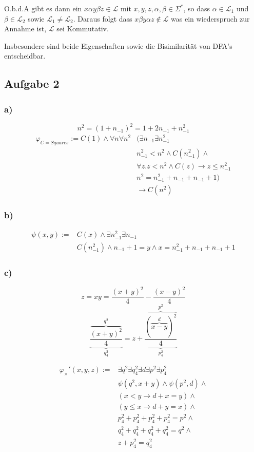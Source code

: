 \documentclass[12pt]{article}
\begin{document}
O.b.d.A gibt es dann ein $x\alpha y\beta z\in \mathcal{L}$ mit $x,y,z,\alpha, \beta\in\Sigma^*$, so dass $\alpha\in \mathcal{L}_1$ und $\beta\in \mathcal{L}_2$ sowie $\mathcal{L}_1\neq \mathcal{L}_2$. Daraus folgt dass $x\beta y\alpha z\notin \mathcal{L}$ was
ein wiederspruch zur Annahme ist, $\mathcal{L}$ sei Kommutativ.

Insbesondere sind beide Eigenschaften sowie die Bisimilarität von DFA's entscheidbar.

\subsection*{Aufgabe 2}
\subsubsection*{a)}
\[ n^2= (1+n_{-1})^2 = 1 + 2 n_{-1} +n_{-1}^2 \]
\begin{align}
  \varphi_{C=Squares} := C(1) \land \forall n\forall n^2 &(\exists n_{-1}\exists n_{-1}^2 \\
  &n_{-1}^2<n^2 \land C(n_{-1}^2) \land \\
  &\forall z. z < n^2 \land C(z) \rightarrow z\leq n_{-1}^2 \\
  &n^2 = n^2_{-1} + n_{-1} + n_{-1} + 1) \\
  &\rightarrow C(n^2)
\end{align}
\subsubsection*{b)}
\begin{align}
  \psi(x,y) :=& C(x) \land \exists n_{-1}^2\exists n_{-1} \\
  &C(n_{-1}^2) \land n_{-1}+1=y\land x = n_{-1}^2+n_{-1}+n_{-1}+1
\end{align}

\subsubsection*{c)}
\[ z = xy = \frac{(x+y)^2}{4} - \frac{(x-y)^2}{4}\]
\[ \underbrace{\frac{\overbrace{(x+y)^2}^{q^2}}{4}}_{q^2_4} = z + \underbrace{\frac{\overbrace{(\overbrace{x-y}^d)^2}^{p^2}}{4}}_{p^2_4}\]

\begin{align}
  \varphi_{\times}' (x,y,z) :=& \exists q^2 \exists q^2_4 \exists d \exists p^2 \exists p^2_4\\
  &\psi(q^2, x+y) \land \psi(p^2,d) \land \\
  &(x<y \rightarrow d+x=y) \land \\
  &(y\leq x \rightarrow d+y=x) \land \\
  &p^2_4 +p^2_4 +p^2_4 +p^2_4 = p^2 \land \\
  &q^2_4 +q^2_4 +q^2_4 +q^2_4 = q^2 \land \\
  &z+p^2_4 = q^2_4
\end{align}
\end{document}
